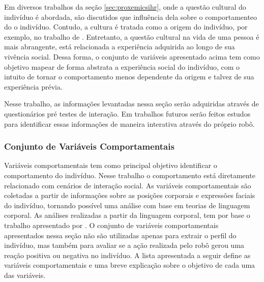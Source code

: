 Em diversos trabalhos da seção \ref{sec:proxemicsihr}, onde a questão cultural do indivíduo é abordada, são discutidos que influência dela sobre o comportamenteo do o indivíduo. Contudo, a cultura é tratada como a origem do indivíduo, por exemplo, no trabalho de . Entretanto, a questão cultural na vida de uma pessoa é mais abrangente, está relacionada a experiência adquirida ao longo de sua vivência social. Dessa forma, o conjunto de variáveis apresentado acima tem como objetivo mapear de forma abstrata a experiência social do indivíduo, com o intuito de tornar o comportamento menos dependente da origem e talvez de sua experiência prévia.

Nesse trabalho, as informações levantadas nessa seção serão adquiridas através de questionários pré testes de interação. Em trabalhos futuros serão feitos estudos para identificar essas informações de maneira interativa através do próprio robô.

\subsubsection{Conjunto de Variáveis Comportamentais}
\label{sec:variaveiscomportamentais}

Variáveis comportamentais tem como principal objetivo identificar o comportamento do indivíduo. Nesse trabalho o comportamento está diretamente relacionado com cenários de interação social. As variáveis comportamentais são coletadas a partir de informações sobre as posições corporais e expressões faciais do indivíduo, tornando possível uma análise com base em teorias de linguagem corporal. As análises realizadas a partir da linguagem corporal, tem por base o trabalho apresentado por . O conjunto de variáveis comportamentais apresentados nessa seção não são utilizadas apenas para extrair o perfil do indivíduo, mas também para avaliar se a ação realizada pelo robô gerou uma reação positiva ou negativa no indivíduo. A lista apresentada a seguir define as variáveis comportamentais e uma breve explicação sobre o objetivo de cada uma das variáveis.

